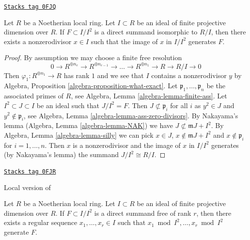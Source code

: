 \begin{lemma}
\label{dpa-lemma-free-summand-in-ideal-finite-proj-dim}
\href{https://stacks.math.columbia.edu/tag/0FJQ}{\texttt{Stacks tag 0FJQ}}

\begin{reference}
\cite{Vasconcelos}
\end{reference}
Let $R$ be a Noetherian local ring. Let $I \subset R$ be an ideal
of finite projective dimension over $R$. If $F \subset I/I^2$ is a
direct summand isomorphic to $R/I$, then there exists a nonzerodivisor
$x \in I$ such that the image of $x$ in $I/I^2$ generates $F$.
\end{lemma}

\begin{proof}
By assumption we may choose a finite free resolution
$$
0 \to R^{\oplus n_e} \to R^{\oplus n_{e-1}} \to \ldots \to
R^{\oplus n_1} \to R \to R/I \to 0
$$
Then $\varphi_1 : R^{\oplus n_1} \to R$ has rank $1$ and
we see that $I$ contains a nonzerodivisor $y$ by
Algebra, Proposition \ref{algebra-proposition-what-exact}.
Let $\mathfrak p_1, \ldots, \mathfrak p_n$ be the associated
primes of $R$, see Algebra, Lemma \ref{algebra-lemma-finite-ass}.
Let $I^2 \subset J \subset I$ be an ideal such that $J/I^2 = F$.
Then $J \not \subset \mathfrak p_i$ for all $i$
as $y^2 \in J$ and $y^2 \not \in \mathfrak p_i$, see
Algebra, Lemma \ref{algebra-lemma-ass-zero-divisors}.
By Nakayama's lemma (Algebra, Lemma \ref{algebra-lemma-NAK})
we have $J \not \subset \mathfrak m J + I^2$.
By Algebra, Lemma \ref{algebra-lemma-silly}
we can pick $x \in J$, $x \not \in \mathfrak m J + I^2$ and
$x \not \in \mathfrak p_i$ for $i = 1, \ldots, n$.
Then $x$ is a nonzerodivisor and the image
of $x$ in $I/I^2$ generates (by Nakayama's lemma)
the summand $J/I^2 \cong R/I$.
\end{proof}

\begin{lemma}[Vasconcelos]
\label{dpa-lemma-vasconcelos}
\href{https://stacks.math.columbia.edu/tag/0FJR}{\texttt{Stacks tag 0FJR}}

\begin{reference}
Local version of \cite[Theorem 1.1]{Vasconcelos}
\end{reference}
Let $R$ be a Noetherian local ring. Let $I \subset R$ be an ideal
of finite projective dimension over $R$. If $F \subset I/I^2$
is a direct summand free of rank $r$, then there exists a regular sequence
$x_1, \ldots, x_r \in I$ such that $x_1 \bmod I^2, \ldots, x_r \bmod I^2$
generate $F$.
\end{lemma}

